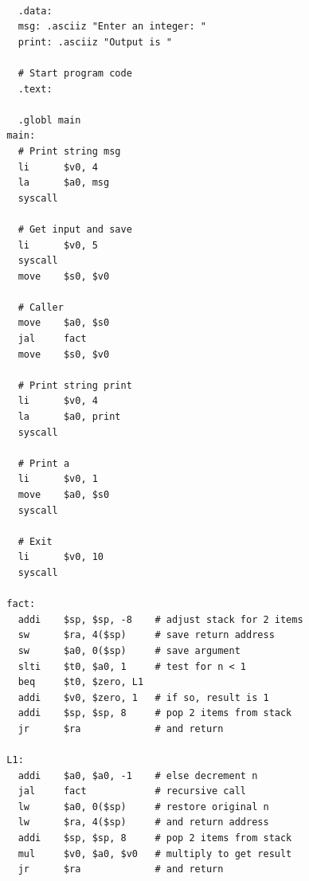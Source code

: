 \documentclass[12pt,a4paper]{article}
\begin{document}
\begin{mdframed}[hidealllines=true,backgroundcolor=magenta!10]
  \begin{lstlisting}

    .data:
    msg: .asciiz "Enter an integer: "
    print: .asciiz "Output is "

    # Start program code
    .text:

    .globl main
  main:
    # Print string msg
    li      $v0, 4
    la      $a0, msg
    syscall

    # Get input and save
    li      $v0, 5
    syscall
    move    $s0, $v0

    # Caller
    move    $a0, $s0
    jal     fact
    move    $s0, $v0

    # Print string print
    li      $v0, 4
    la      $a0, print
    syscall

    # Print a
    li      $v0, 1
    move    $a0, $s0
    syscall

    # Exit
    li      $v0, 10
    syscall

  fact:
    addi    $sp, $sp, -8    # adjust stack for 2 items
    sw      $ra, 4($sp)     # save return address
    sw      $a0, 0($sp)     # save argument
    slti    $t0, $a0, 1     # test for n < 1
    beq     $t0, $zero, L1
    addi    $v0, $zero, 1   # if so, result is 1
    addi    $sp, $sp, 8     # pop 2 items from stack
    jr      $ra             # and return

  L1:
    addi    $a0, $a0, -1    # else decrement n
    jal     fact            # recursive call
    lw      $a0, 0($sp)     # restore original n
    lw      $ra, 4($sp)     # and return address
    addi    $sp, $sp, 8     # pop 2 items from stack
    mul     $v0, $a0, $v0   # multiply to get result
    jr      $ra             # and return

    \end{lstlisting}
\end{mdframed}
\end{document}
